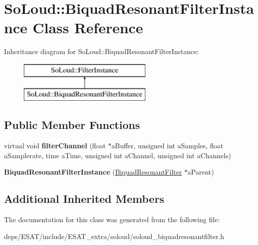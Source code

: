 \hypertarget{class_so_loud_1_1_biquad_resonant_filter_instance}{}\section{So\+Loud\+:\+:Biquad\+Resonant\+Filter\+Instance Class Reference}
\label{class_so_loud_1_1_biquad_resonant_filter_instance}
Inheritance diagram for So\+Loud\+:\+:Biquad\+Resonant\+Filter\+Instance\+:\begin{figure}[H]
\begin{center}
\leavevmode
\includegraphics[height=2.000000cm]{class_so_loud_1_1_biquad_resonant_filter_instance}
\end{center}
\end{figure}
\subsection*{Public Member Functions}
\begin{DoxyCompactItemize}
\item 
\mbox{\label{class_so_loud_1_1_biquad_resonant_filter_instance_acc516edf0a69500fd6d297cab6717a98}} 
virtual void {\bfseries filter\+Channel} (float $\ast$a\+Buffer, unsigned int a\+Samples, float a\+Samplerate, time a\+Time, unsigned int a\+Channel, unsigned int a\+Channels)
\item 
\mbox{\label{class_so_loud_1_1_biquad_resonant_filter_instance_a2261a84c040a0ab189fb631a6dc87ab0}} 
{\bfseries Biquad\+Resonant\+Filter\+Instance} (\mbox{\hyperlink{class_so_loud_1_1_biquad_resonant_filter}{Biquad\+Resonant\+Filter}} $\ast$a\+Parent)
\end{DoxyCompactItemize}
\subsection*{Additional Inherited Members}


The documentation for this class was generated from the following file\+:\begin{DoxyCompactItemize}
\item 
deps/\+E\+S\+A\+T/include/\+E\+S\+A\+T\+\_\+extra/soloud/soloud\+\_\+biquadresonantfilter.\+h\end{DoxyCompactItemize}

